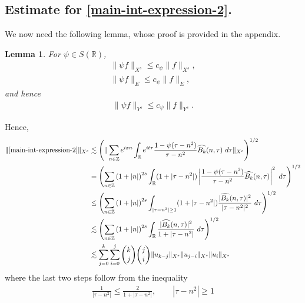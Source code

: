 \documentclass[12pt,reqno]{amsart}
\numberwithin{equation}{section}  %
\numberwithin{figure}{section}
\newcommand{\rr}{\mathbb{R}}
\newcommand{\zz}{\mathbb{Z}}
\newcommand{\wh}{\widehat}
\theoremstyle{plain}
\newtheorem{lemma}{Lemma}
\theoremstyle{definition}
\theoremstyle{remark}
\begin{document}
\subsection{Estimate for \eqref{main-int-expression-2}.}
We now need the following lemma, whose proof is provided in the appendix.
%
%
%
%
%
%
%
%
\begin{lemma}
\label{lem:schwartz-mult}
  For $\psi \in S(\rr)$,
%
%
\begin{gather}
  \label{schwartz-mult-piece-1}
    \|\psi f \|_{X^s} \le c_{\psi} \|f \|_{X^s},
    \\
    \label{schwartz-mult-piece-2}
    \|\psi f \|_{E} \le c_{\psi} \|f \|_{E},
  \end{gather}
  and hence
  \begin{gather}
    \label{schwartz-mult}
\|\psi f \|_{Y^s} \le c_{\psi} \|f \|_{Y^s}.
\end{gather}
%
%
\end{lemma}
%
%
Hence,
%
%
\begin{equation}
  \label{main-int2-est-X-s-part}
  \begin{split}
    \|\eqref{main-int-expression-2}\|_{X^s} 
    & \lesssim 
    \left( \| \sum_{n \in \zz} e^{ixn} \int_\rr 
    e^{it \tau} \frac{ 1 - \psi (\tau - n^{2} ) 
    }{\tau - n^{2}} \wh{B_k}(n, \tau) \ 
    d \tau\|_{X^s} \right)^{1/2}
    \\
    & =  \left( \sum_{n \in \zz} \left (1 + |n| \right )^{2s} \int_\rr
    (1 + |\tau - n^{2}|) \left | \frac{1 - \psi(\tau - n^{2 
    })}{\tau - n^{2}} 
    \wh{B_k}(n, \tau) \right |^2 \ d 
    \tau \right)^{1/2}
    \\
    & \le \left( \sum_{n \in \zz} \left (1 + |n| \right )^{2s} \int_{| \tau - n^{2}| \ge 1}
    (1 + |\tau - n^{2}|) \frac{|\wh{B_k}(n, \tau)|^2 }{|\tau - n^{2}|^2} 
    \ d 
    \tau \right)^{1/2}
    \\
    & \lesssim  \left( \sum_{n \in 
    \zz} \left (1 + |n| \right )^{2s} \int_\rr
    \frac{|\wh{B_k}(n, \tau) |^2}{1+ |\tau - 
    n^{2}|} 
     \ d \tau 
    \right)^{1/2}
    \\
    & \lesssim 
    \sum_{j=0}^{k} \sum_{i=0}^{j} {k \choose j}{j \choose i}
    \|u_{k-j}\|_{X^s} \| u_{j-i}\|_{X^s}
    \| u_i \|_{X^s}
  \end{split}
\end{equation}
%
%
where the last two steps follow from the inequality 
%
\begin{equation}
  \label{one-plus-ineq}
  \begin{split}
    \frac{1}{|\tau - n^{2}| } \le \frac{2}{1 + |\tau - n^{2}| }, 
    \qquad |\tau - n^{2}| \ge 1
  \end{split}
\end{equation}
\end{document}
